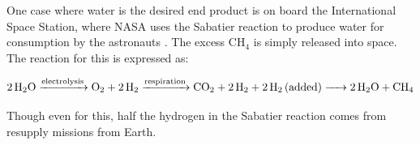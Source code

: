 One case where water is the desired end product is on board the International Space Station, where NASA uses the Sabatier reaction to produce water for consumption by the astronauts \cite{the_sabatier_system}. The excess CH$_4$  is simply released into space. The reaction for this is expressed as:

\begin{equation}
    \ce{2H_2O ->[ electrolysis ] O_2 + 2H_2 ->[ respiration ] CO_2 + 2H_2 + 2H_2 (added) -> 2H_2O + CH_4 }
\end{equation}

Though even for this, half the hydrogen in the Sabatier reaction comes from resupply missions from Earth.


\newpage



%
%
%
%
